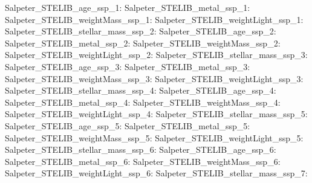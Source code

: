 Salpeter\_STELIB\_age\_ssp\_1:  \newline 
Salpeter\_STELIB\_metal\_ssp\_1:  \newline 
Salpeter\_STELIB\_weightMass\_ssp\_1:  \newline 
Salpeter\_STELIB\_weightLight\_ssp\_1:  \newline 
Salpeter\_STELIB\_stellar\_mass\_ssp\_2:  \newline 
Salpeter\_STELIB\_age\_ssp\_2:  \newline 
Salpeter\_STELIB\_metal\_ssp\_2:  \newline 
Salpeter\_STELIB\_weightMass\_ssp\_2:  \newline 
Salpeter\_STELIB\_weightLight\_ssp\_2:  \newline 
Salpeter\_STELIB\_stellar\_mass\_ssp\_3:  \newline 
Salpeter\_STELIB\_age\_ssp\_3:  \newline 
Salpeter\_STELIB\_metal\_ssp\_3:  \newline 
Salpeter\_STELIB\_weightMass\_ssp\_3:  \newline 
Salpeter\_STELIB\_weightLight\_ssp\_3:  \newline 
Salpeter\_STELIB\_stellar\_mass\_ssp\_4:  \newline 
Salpeter\_STELIB\_age\_ssp\_4:  \newline 
Salpeter\_STELIB\_metal\_ssp\_4:  \newline 
Salpeter\_STELIB\_weightMass\_ssp\_4:  \newline 
Salpeter\_STELIB\_weightLight\_ssp\_4:  \newline 
Salpeter\_STELIB\_stellar\_mass\_ssp\_5:  \newline 
Salpeter\_STELIB\_age\_ssp\_5:  \newline 
Salpeter\_STELIB\_metal\_ssp\_5:  \newline 
Salpeter\_STELIB\_weightMass\_ssp\_5:  \newline 
Salpeter\_STELIB\_weightLight\_ssp\_5:  \newline 
Salpeter\_STELIB\_stellar\_mass\_ssp\_6:  \newline 
Salpeter\_STELIB\_age\_ssp\_6:  \newline 
Salpeter\_STELIB\_metal\_ssp\_6:  \newline 
Salpeter\_STELIB\_weightMass\_ssp\_6:  \newline 
Salpeter\_STELIB\_weightLight\_ssp\_6:  \newline 
Salpeter\_STELIB\_stellar\_mass\_ssp\_7:  \newline 
